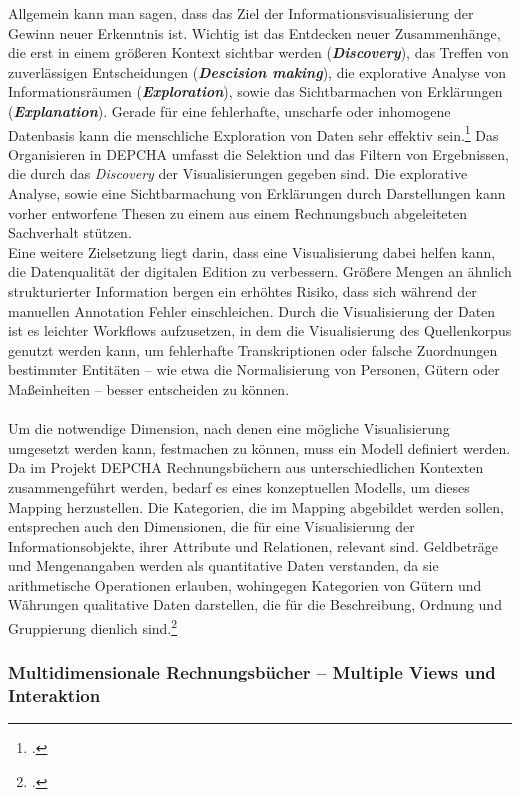 \documentclass[12pt,a4paper]{article}
\begin{document}
Allgemein kann man sagen, dass das Ziel der Informationsvisualisierung der Gewinn neuer Erkenntnis ist. Wichtig ist das Entdecken neuer Zusammenhänge, die erst in einem größeren Kontext sichtbar werden (\textbf{\textit{Discovery}}), das Treffen von zuverlässigen Entscheidungen (\textbf{\textit{Descision making}}), die explorative Analyse von Informationsräumen (\textbf{\textit{Exploration}}), sowie das Sichtbarmachen von Erklärungen (\textbf{\textit{Explanation}}). Gerade für eine fehlerhafte, unscharfe oder inhomogene Datenbasis kann die menschliche Exploration von Daten sehr effektiv sein.\footcite[][S.439-444]{preim2010interaktive} Das Organisieren in DEPCHA umfasst die Selektion und das Filtern von Ergebnissen, die durch das \textit{Discovery} der Visualisierungen gegeben sind. Die explorative Analyse, sowie eine Sichtbarmachung von Erklärungen durch Darstellungen kann vorher entworfene Thesen zu einem aus einem Rechnungsbuch abgeleiteten Sachverhalt stützen.
\\
Eine weitere Zielsetzung liegt darin, dass eine Visualisierung dabei helfen kann, die Datenqualität der digitalen Edition zu verbessern. Größere Mengen an ähnlich strukturierter Information bergen ein erhöhtes Risiko, dass sich während der manuellen Annotation Fehler einschleichen. Durch die Visualisierung der Daten ist es leichter Workflows aufzusetzen, in dem die Visualisierung des Quellenkorpus genutzt werden kann, um fehlerhafte Transkriptionen oder falsche Zuordnungen bestimmter Entitäten -- wie etwa die Normalisierung von Personen, Gütern oder Maßeinheiten -- besser entscheiden zu können.
\\
\\
Um die notwendige Dimension, nach denen eine mögliche Visualisierung umgesetzt werden kann, festmachen zu können, muss ein Modell definiert werden. Da im Projekt DEPCHA Rechnungsbüchern aus unterschiedlichen Kontexten zusammengeführt werden, bedarf es eines konzeptuellen Modells, um dieses Mapping herzustellen. Die Kategorien, die im Mapping abgebildet werden sollen, entsprechen auch den Dimensionen, die für eine Visualisierung der Informationsobjekte, ihrer Attribute und Relationen, relevant sind. Geldbeträge und Mengenangaben werden als quantitative Daten verstanden, da sie arithmetische Operationen erlauben, wohingegen Kategorien von Gütern und Währungen qualitative Daten darstellen, die für die Beschreibung, Ordnung und Gruppierung dienlich sind.\footcite[][S.448-450]{preim2010interaktive}

\subsubsection{Multidimensionale Rechnungsbücher – Multiple Views und Interaktion}
\end{document}
